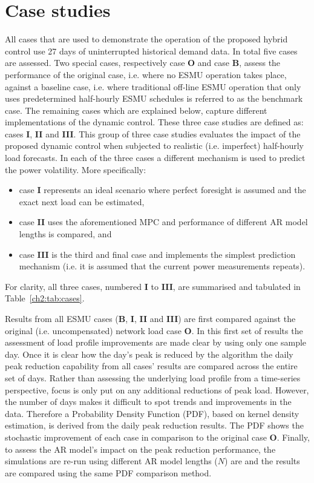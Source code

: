 \section{Case studies}
\label{ch2:sec:case-studies}

All cases that are used to demonstrate the operation of the proposed hybrid control use 27 days of uninterrupted historical demand data.
In total five cases are assessed.
Two special cases, respectively case \textbf{O} and case \textbf{B}, assess the performance of the original case, i.e. where no ESMU operation takes place, against a baseline case, i.e.  where traditional off-line ESMU operation that only uses predetermined half-hourly ESMU schedules is referred to as the benchmark case.
The remaining cases which are explained below, capture different implementations of the dynamic control.
These three case studies are defined as: cases \textbf{I}, \textbf{II} and \textbf{III}.
This group of three case studies evaluates the impact of the proposed dynamic control when subjected to realistic (i.e. imperfect) half-hourly load forecasts.
In each of the three cases a different mechanism is used to predict the power volatility.
More specifically:
\begin{itemize}
	\item case \textbf{I} represents an ideal scenario where perfect foresight is assumed and the exact next load can be estimated,
	\item case \textbf{II} uses the aforementioned MPC and performance of different AR model lengths is compared, and
	\item case \textbf{III} is the third and final case and implements the simplest prediction mechanism (i.e. it is assumed that the current power measurements repeats).
\end{itemize}
For clarity, all three cases, numbered \textbf{I} to \textbf{III}, are summarised and tabulated in Table~\ref{ch2:tab:cases}.



Results from all ESMU cases (\textbf{B}, \textbf{I}, \textbf{II} and \textbf{III}) are first compared against the original (i.e. uncompensated) network load case \textbf{O}.
In this first set of results the assessment of load profile improvements are made clear by using only one sample day.
Once it is clear how the day's peak is reduced by the algorithm the daily peak reduction capability from all cases' results are compared across the entire set of days.
Rather than assessing the underlying load profile from a time-series perspective, focus is only put on any additional reductions of peak load.
However, the number of days makes it difficult to spot trends and improvements in the data.
Therefore a Probability Density Function (PDF), based on kernel density estimation, is derived from the daily peak reduction results.
The PDF shows the stochastic improvement of each case in comparison to the original case \textbf{O}.
Finally, to assess the AR model's impact on the peak reduction performance, the simulations are re-run using different AR model lengths ($N$) are and the results are compared using the same PDF comparison method.
